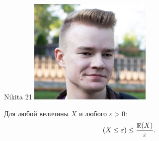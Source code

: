 \documentclass[12pt]{article}
\let\P\relax
\DeclareMathOperator{\P}{\mathbb{P}}
\DeclareMathOperator{\E}{\mathbb{E}}
\begin{document}
\begin{minipage}{0.45\textwidth}
\begin{tinderm}{Nikita 21}
\includegraphics[width=\textwidth]{tinder-photo/nikita.png}

  

\begin{mybox}
Для любой величины $X$ и любого $\varepsilon>0$:
\[
\P (X \leq \varepsilon) \leq \frac{\E(X)}{\varepsilon}.
\]
\end{mybox}
\end{tinderm}
\end{minipage}
\end{document}
